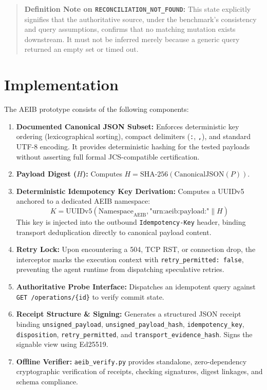 \documentclass[10pt,journal,compsoc]{IEEEtran}
\begin{document}
\begin{quote}
\textbf{Definition Note on \texttt{RECONCILIATION\_NOT\_FOUND}:} This state explicitly signifies that the authoritative source, under the benchmark's consistency and query assumptions, confirms that no matching mutation exists downstream. It must not be inferred merely because a generic query returned an empty set or timed out.
\end{quote}

\section{Implementation}

The AEIB prototype consists of the following components:
\begin{enumerate}
    \item \textbf{Documented Canonical JSON Subset:} Enforces deterministic key ordering (lexicographical sorting), compact delimiters (\texttt{:}, \texttt{,}), and standard UTF-8 encoding. It provides deterministic hashing for the tested payloads without asserting full formal JCS-compatible certification.
    \item \textbf{Payload Digest ($H$):} Computes $H = \text{SHA-256}(\text{CanonicalJSON}(P))$.
    \item \textbf{Deterministic Idempotency Key Derivation:} Computes a UUIDv5 anchored to a dedicated AEIB namespace:
    \begin{equation}
    K = \text{UUIDv5}(\text{Namespace}_{\text{AEIB}}, \text{"urn:aeib:payload:"} \parallel H)
    \end{equation}
    This key is injected into the outbound \texttt{Idempotency-Key} header, binding transport deduplication directly to canonical payload content.
    \item \textbf{Retry Lock:} Upon encountering a 504, TCP RST, or connection drop, the interceptor marks the execution context with \texttt{retry\_permitted: false}, preventing the agent runtime from dispatching speculative retries.
    \item \textbf{Authoritative Probe Interface:} Dispatches an idempotent query against \texttt{GET /operations/\{id\}} to verify commit state.
    \item \textbf{Receipt Structure \& Signing:} Generates a structured JSON receipt binding \texttt{unsigned\_payload}, \texttt{unsigned\_payload\_hash}, \texttt{idempotency\_key}, \texttt{disposition}, \texttt{retry\_permitted}, and \texttt{transport\_evidence\_hash}. Signs the signable view using Ed25519.
    \item \textbf{Offline Verifier:} \texttt{aeib\_verify.py} provides standalone, zero-dependency cryptographic verification of receipts, checking signatures, digest linkages, and schema compliance.
\end{enumerate}
\end{document}
